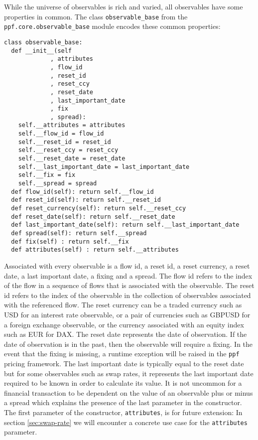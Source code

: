 While the universe of observables is rich and varied, all observables
have some properties in common. The class \verb|observable_base| from
the \verb|ppf.core.observable_base| module encodes these common
properties:
\begin{verbatim}
class observable_base:
  def __init__(self
             , attributes
             , flow_id
             , reset_id
             , reset_ccy
             , reset_date
             , last_important_date
             , fix
             , spread):
    self.__attributes = attributes
    self.__flow_id = flow_id
    self.__reset_id = reset_id
    self.__reset_ccy = reset_ccy
    self.__reset_date = reset_date
    self.__last_important_date = last_important_date
    self.__fix = fix
    self.__spread = spread
  def flow_id(self): return self.__flow_id
  def reset_id(self): return self.__reset_id
  def reset_currency(self): return self.__reset_ccy
  def reset_date(self): return self.__reset_date
  def last_important_date(self): return self.__last_important_date
  def spread(self): return self.__spread
  def fix(self) : return self.__fix
  def attributes(self) : return self.__attributes
\end{verbatim}
Associated with every observable is a flow id, a reset id, a reset
currency, a reset date, a last important date, a fixing and a
spread. The flow id refers to the index of the flow in a sequence of
flows that is associated with the observable. The reset id
refers to the index of the observable in the collection of observables
associated with the referenced flow. The reset currency can be a
traded currency such as USD for an interest rate observable, or a pair
of currencies such as GBPUSD for a foreign exchange observable, or the
currency associated with an equity index such as EUR for DAX. The
reset date represents the date of observation. If the date of
observation is in the past, then the observable will require a
fixing. In the event that the fixing is missing, a runtime exception
will be raised in the \verb|ppf| pricing framework. The last important
date is typically equal to the reset date but for some observables
such as swap rates, it represents the last important date required to
be known in order to calculate its value. It is not uncommon
for a financial transaction to be dependent on the value of an
observable plus or minus a spread which explains the presence of the 
last parameter in the constructor. The first parameter of the
constructor, \verb|attributes|, is for future extension: In section
\ref{sec:swap-rate} we will encounter a concrete use case for the 
\verb|attributes| parameter.

